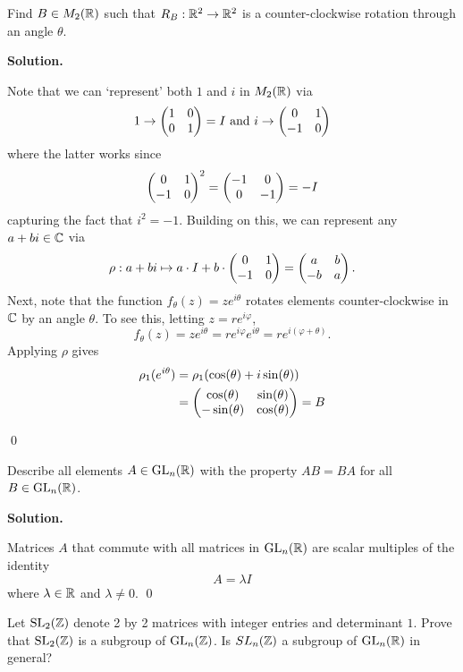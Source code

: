 \documentclass[12pt]{book}
\theoremstyle{definition}
\newenvironment{solution}
{%
  \par\noindent\textbf{Solution.}\quad
}
{%
  \qed\par
}
\begin{document}
\begin{taggedexercise}[Complete]
  Find $B \in M_2(\mathbb{R})$ such that $R_B : \mathbb{R}^2 \to \mathbb{R}^2$ is a counter-clockwise rotation through an angle $\theta$.
\end{taggedexercise}

\begin{solution}
  Note that we can `represent' both $1$ and $i$ in $M_2(\mathbb{R})$ via
  \[
  1 \to \begin{pmatrix} 1 & 0 \\ 0 & 1 \end{pmatrix} = I \text{ and } i \to \begin{pmatrix} 0 & 1 \\ -1 & 0 \end{pmatrix}
  \]
  where the latter works since
  \[
    \begin{pmatrix} 0 & 1 \\ -1 & 0 \end{pmatrix}^2 = \begin{pmatrix} -1 & 0 \\ 0 & -1 \end{pmatrix} = -I
  \]
  capturing the fact that $i^2 = -1$. 
  Building on this, we can represent any $a+bi \in \mathbb{C}$ via 
  \[
    \rho : a+bi\mapsto a \cdot I + b \cdot \begin{pmatrix} 0 & 1 \\ -1 & 0 \end{pmatrix} = \begin{pmatrix} a & b \\ -b & a \end{pmatrix}.
  \]
  Next, note that the function $f_\theta(z) = ze^{i\theta}$ rotates elements counter-clockwise in $\mathbb{C}$ by an angle $\theta$. 
  To see this, letting $z=re^{i\varphi}$,
  \[f_\theta(z) = ze^{i\theta} = re^{i\varphi}e^{i\theta} = re^{i(\varphi + \theta)}.\]
  Applying $\rho$ gives
  \[
  \begin{aligned}
    \rho_1(e^{i\theta}) &= \rho_1(\cos(\theta) + i\sin(\theta)) \\
                        &= \begin{pmatrix} \cos(\theta) & \sin(\theta) \\ -\sin(\theta) & \cos(\theta) \end{pmatrix} = B
  \end{aligned}
  \]


\end{solution}

\begin{taggedexercise}[WIP]
  Describe all elements $A \in \mathrm{GL}_{n}(\mathbb{R})$ with the property $AB=BA$ for all $B \in \mathrm{GL}_{n}(\mathbb{R})$.
\end{taggedexercise}

\begin{solution}
  Matrices $A$ that commute with all matrices in $\mathrm{GL}_{n}(\mathbb{R})$ are scalar multiples of the identity
  \[
  A = \lambda I
  \]
  where $\lambda \in \mathbb{R}$ and $\lambda \neq 0$.
\end{solution}

\begin{taggedexercise}[Complete]
  Let $\mathrm{SL}_{2}(\mathbb{Z})$ denote 2 by 2 matrices with integer entries and determinant $1$.
  Prove that $\mathrm{SL}_{2}(\mathbb{Z})$ is a subgroup of $\mathrm{GL}_{n}(\mathbb{Z})$. 
  Is $SL_n(\mathbb{Z})$ a subgroup of $\mathrm{GL}_{n}(\mathbb{R})$ in general?
\end{taggedexercise}
\end{document}
